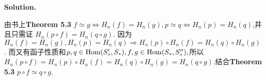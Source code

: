 \documentclass[a4paper]{book}
\newenvironment{solution}%
{\noindent\textbf{Solution.}}%
{\qedhere}
\numberwithin{equation}{chapter}
\theoremstyle{definition}
\begin{document}
\begin{solution}

  由书上\textbf{Theorem 5.3} $f \simeq g \Leftrightarrow H_n(f) = H_n(g), p \simeq q \Leftrightarrow H_n(p) = H_n(q)$,并且只需证 $H_n(p \circ f) = H_n(q \circ g)$. 因为 $H_n(f) = H_n(g), H_n(p) = H_n(q) \Rightarrow H_n(p) \circ H_n(f) = H_n(q) \circ H_n(g)$. 而又有函子性质和$p,q \in \textmd{Hom}(S_*^\prime, S_*), f,g \in \textmd{Hom}(S_*, S_*^{\prime \prime}),$所以$H_n(p \circ f) = H_n(p) \circ H_n(f) = H_n(q) \circ H_n(g) = H_n(q \circ g)$.结合\textbf{Theorem 5.3} $p \circ f \simeq q \circ g$.
\end{solution}


%   

%   

%   


\end{document}
